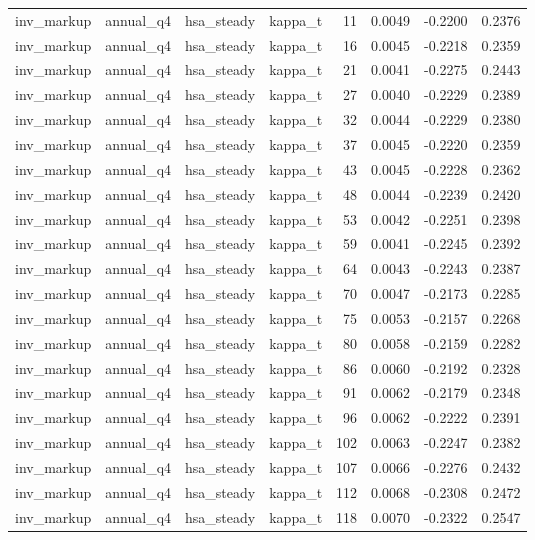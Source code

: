 \begin{tabular}{llllrrrr}
inv\_markup & annual\_q4 & hsa\_steady & kappa\_t & 11 & 0.0049 & -0.2200 & 0.2376 \\
inv\_markup & annual\_q4 & hsa\_steady & kappa\_t & 16 & 0.0045 & -0.2218 & 0.2359 \\
inv\_markup & annual\_q4 & hsa\_steady & kappa\_t & 21 & 0.0041 & -0.2275 & 0.2443 \\
inv\_markup & annual\_q4 & hsa\_steady & kappa\_t & 27 & 0.0040 & -0.2229 & 0.2389 \\
inv\_markup & annual\_q4 & hsa\_steady & kappa\_t & 32 & 0.0044 & -0.2229 & 0.2380 \\
inv\_markup & annual\_q4 & hsa\_steady & kappa\_t & 37 & 0.0045 & -0.2220 & 0.2359 \\
inv\_markup & annual\_q4 & hsa\_steady & kappa\_t & 43 & 0.0045 & -0.2228 & 0.2362 \\
inv\_markup & annual\_q4 & hsa\_steady & kappa\_t & 48 & 0.0044 & -0.2239 & 0.2420 \\
inv\_markup & annual\_q4 & hsa\_steady & kappa\_t & 53 & 0.0042 & -0.2251 & 0.2398 \\
inv\_markup & annual\_q4 & hsa\_steady & kappa\_t & 59 & 0.0041 & -0.2245 & 0.2392 \\
inv\_markup & annual\_q4 & hsa\_steady & kappa\_t & 64 & 0.0043 & -0.2243 & 0.2387 \\
inv\_markup & annual\_q4 & hsa\_steady & kappa\_t & 70 & 0.0047 & -0.2173 & 0.2285 \\
inv\_markup & annual\_q4 & hsa\_steady & kappa\_t & 75 & 0.0053 & -0.2157 & 0.2268 \\
inv\_markup & annual\_q4 & hsa\_steady & kappa\_t & 80 & 0.0058 & -0.2159 & 0.2282 \\
inv\_markup & annual\_q4 & hsa\_steady & kappa\_t & 86 & 0.0060 & -0.2192 & 0.2328 \\
inv\_markup & annual\_q4 & hsa\_steady & kappa\_t & 91 & 0.0062 & -0.2179 & 0.2348 \\
inv\_markup & annual\_q4 & hsa\_steady & kappa\_t & 96 & 0.0062 & -0.2222 & 0.2391 \\
inv\_markup & annual\_q4 & hsa\_steady & kappa\_t & 102 & 0.0063 & -0.2247 & 0.2382 \\
inv\_markup & annual\_q4 & hsa\_steady & kappa\_t & 107 & 0.0066 & -0.2276 & 0.2432 \\
inv\_markup & annual\_q4 & hsa\_steady & kappa\_t & 112 & 0.0068 & -0.2308 & 0.2472 \\
inv\_markup & annual\_q4 & hsa\_steady & kappa\_t & 118 & 0.0070 & -0.2322 & 0.2547 \\

\end{tabular}
